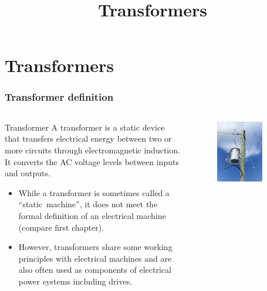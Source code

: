 \section{Transformers}
\title{Transformers}  

\begin{frame}[plain]
    \titlepage
\end{frame}

\begin{frame}
	\frametitle{Transformer definition}
    \begin{columns}
		\begin{column}{0.65\textwidth}
            \begin{varblock}{Transformer}
                A transformer is a static device that transfers electrical energy between two or more circuits through electromagnetic induction. It converts the AC voltage levels between inputs and outputs.   
            \end{varblock}
            \begin{itemize}
                \item<2-> While a transformer is sometimes called a ``static~machine'', it does not meet the formal definition of an electrical machine (compare first chapter).
                \item<3-> However, transformers share some working principles with electrical machines and are also often used as components of electrical power systems including drives.
            \end{itemize}
		\end{column}
        \hfill
		\begin{column}{0.35\textwidth}
			\onslide<1->
			\begin{figure}
				\centering
				\includegraphics[width=0.75\textwidth]{fig/lec04/Transformer_rural_pole.jpg}

\end{figure}
\end{column}
\end{columns}
\end{frame}

